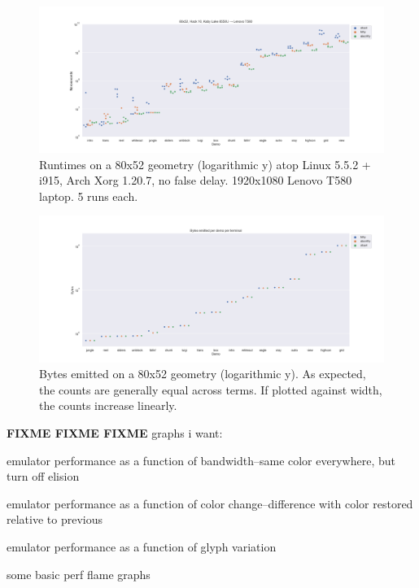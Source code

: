 \begin{figure}[!htb]
\centering
\includegraphics[width=1\textwidth]{media/i915-80x52.png}
\caption[80x52 Intel i7-8550U benchmarks.]{Runtimes on a 80x52 geometry (logarithmic y) atop Linux 5.5.2 + i915, Arch Xorg 1.20.7, no false delay. 1920x1080 Lenovo T580 laptop. 5 runs each.}
\label{fig:intel-full}
\end{figure}

\begin{figure}[!htb]
\centering
\includegraphics[width=1\textwidth]{media/plotbytes.png}
\caption[Bytes output per demo per term.]{Bytes emitted on a 80x52 geometry (logarithmic y). As expected, the counts are generally equal across terms. If plotted against width, the counts increase linearly.}
\label{fig:nvidia-full}
\end{figure}

\textbf{FIXME FIXME FIXME}
graphs i want:
\begin{denseitemize}
\item{emulator performance as a function of bandwidth--same color everywhere, but turn off elision}
\item{emulator performance as a function of color change--difference with color restored relative to previous}
\item{emulator performance as a function of glyph variation}
\item{some basic perf flame graphs}
\end{denseitemize}
